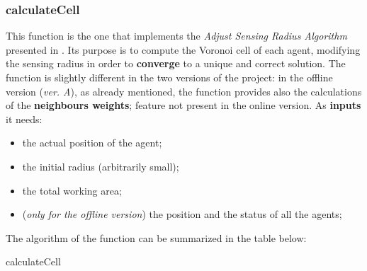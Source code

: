 \documentclass[a4paper,11pt,oneside]{book}
\makeatletter
\def\BState{\State\hskip-\ALG@thistlm}
\makeatother
\begin{document}
\subsubsection{calculateCell}
	This function is the one that implements the \textit{Adjust Sensing Radius Algorithm} presented in \cite{K1}. Its purpose is to compute the Voronoi cell of each agent, modifying the sensing radius in order to \textbf{converge} to a unique and correct solution. The function is slightly different in the two versions of the project: in the offline version (\textit{ver. A}), as already mentioned, the function provides also the calculations of the \textbf{neighbours weights}; feature not present in the online version.
	 As \textbf{inputs} it needs:
	 \begin{itemize}
	 	\item the actual position of the agent;
		\item the initial radius (arbitrarily small);
		\item the total working area;
		\item (\textit{only for the offline version}) the position and the status of all the agents;
	\end{itemize}
The algorithm of the function can be summarized in the table below:
\begin{algorithm}[H]
\caption{calculateCell}\label{euclid}
\end{algorithm}
\end{document}
